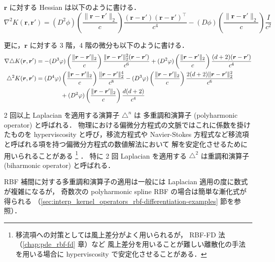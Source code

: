 $\bm{r}$ に対する Hessian は以下のように書ける．
\begin{equation}
    \nabla^2 K(\bm{r}, \bm{r}') =
    (D^2 \phi)\left(\frac{\|\bm{r} - \bm{r}'\|_2}{c}\right) \frac{(\bm{r} - \bm{r}')(\bm{r} - \bm{r}')^\top}{c^4}
    -(D \phi)\left(\frac{\|\bm{r} - \bm{r}'\|_2}{c}\right) \frac{I}{c^2}
\end{equation}

更に，$\bm{r}$ に対する 3 階，4 階の微分も以下のように書ける．
\begin{align}
    \nabla \triangle K(\bm{r}, \bm{r}') & =
    -(D^3 \varphi)\left(\frac{\|\bm{r} - \bm{r}'\|_2}{c}\right)
    \frac{\|\bm{r} - \bm{r}'\|_2^2 (\bm{r} - \bm{r}')}{c^6}
    +(D^2 \varphi)\left(\frac{\|\bm{r} - \bm{r}'\|_2}{c}\right)
    \frac{(d+2)(\bm{r} - \bm{r}')}{c^4}
    \\
    \triangle^2 K(\bm{r}, \bm{r}')      & =
    (D^4 \varphi)\left(\frac{\|\bm{r} - \bm{r}'\|_2}{c}\right)
    \frac{\|\bm{r} - \bm{r}'\|_2^4}{c^8}
    -(D^3 \varphi)\left(\frac{\|\bm{r} - \bm{r}'\|_2}{c}\right)
    \frac{2(d+2)\|\bm{r} - \bm{r}'\|_2^2}{c^6}
    \notag                                  \\ &\hspace{4em}
    +(D^2 \varphi)\left(\frac{\|\bm{r} - \bm{r}'\|_2}{c}\right)
    \frac{d(d+2)}{c^4}
\end{align}

2 回以上 Laplacian を適用する演算子 $\triangle^n$ は
多重調和演算子 (polyharmonic operator)
と呼ばれる．
物理における偏微分方程式の文脈ではこれに係数を掛けたものを hyperviscosity
と呼び，移流方程式や Navier-Stokes 方程式など移流項と呼ばれる項を持つ偏微分方程式の数値解法において
解を安定化させるために用いられることがある
\footnote{移流項への対策としては風上差分がよく用いられるが，%
    RBF-FD 法（\ref{chap:pde_rbf-fd} 章）など%
    風上差分を用いることが難しい離散化の手法を用いる場合に hyperviscosity で安定化させることがある．}
\cite{Fornberg2015,Vaupotic2024,Rot2026}．
特に 2 回 Laplacian を適用する $\triangle^2$ は重調和演算子 (biharmonic operator)
と呼ばれる．

RBF 補間に対する多重調和演算子の適用は一般には Laplacian 適用の度に数式が複雑になるが，
奇数次の polyharmonic spline RBF の場合は簡単な漸化式が得られる
（\ref{sec:interp_kernel_operators_rbf-differentiation-examples} 節を参照）．

